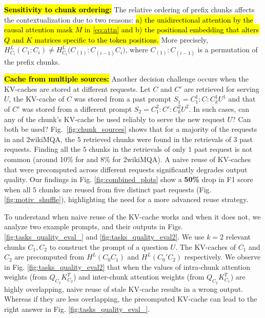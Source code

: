 \hl{\textbf{Sensitivity to chunk ordering:} }
The relative ordering of prefix chunks affects the contextualization due to two reasons: \hl{a) the unidirectional attention by the causal attention mask $M$ in \eqref{eq:attn} and b) the positional embedding that alters $Q$ and $K$ matrices specific to the token positions.} More precisely, $H^L_{C_i}(C_1\!:\!C_i) \neq H^L_{C_i}\big(C_{(1)}\!:\!C_{(i-1)}C_i\big)$, where $C_{(1)}\!:C_{(i-1)}$ is a permutation of the prefix chunks. 




\hl{\textbf{Cache from multiple sources:}} Another decision challenge occurs when the KV-caches are stored at different requests. Let $C$ and $C'$ are retrieved for serving $U$, the KV-cache of $C$ was stored from a past prompt $S_1=C_1^1\!:\!C\!:\!C_k^1U^1$ and that of $C'$ was stored from a different prompt $S_2=C_1^2\!:\!C'\!:\!C_k^2U^2$.
In such cases, can any of the chunk's KV-cache be used reliably to serve the new request $U$? Can both be used?
Fig.~\ref{fig:chunk_sources} shows that for a majority of the requests in \X and {\color{black}2wikiMQA}, the $5$ retrieved chunks were found in the retrievals of $3$ past requests. Finding all the $5$ chunks in the retrievals of only $1$ past request is not common (around 10\% for \X and {\color{black}8\% for 2wikiMQA}).
A naive reuse of KV-caches that were precomputed across different requests significantly degrades output quality. Our findings in Fig. \ref{fig:combined_plots} show a \textbf{50\%} drop in F1 score when all $5$ chunks are reused from five distinct past requests (Fig. \ref{fig:motiv_shuffle}), highlighting the need for a more advanced reuse strategy. 

To understand when naive reuse of the KV-cache works and when it does not, 
we analyze two example prompts, 
and their outputs in Figs. \ref{fig:tasks_quality_eval_} and \ref{fig:tasks_quality_eval2}. We use $k=2$ relevant chunks $C_1,C_2$ to construct the prompt of a question $U$. The KV-caches of $C_1$ and $C_2$ are precomputed from $H^L(C_0C_1)$ and $H^L(C_0'C_2)$ respectively. We observe in Fig. \ref{fig:tasks_quality_eval2} that when the values of intra-chunk attention weights (from $Q_{C_2}K^T_{C_2}$) and inter-chunk attention weights (from $Q_{C_2}K^T_{C_1}$) are highly overlapping, naive reuse of stale KV-cache results in a wrong output. Whereas if they are less overlapping, the precomputed KV-cache can lead to the right answer in Fig. \ref{fig:tasks_quality_eval_}. 


